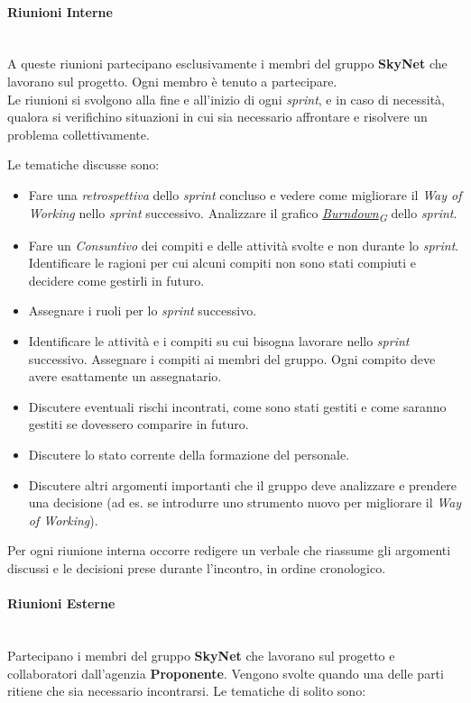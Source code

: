 \documentclass[12pt, a4paper]{article}
\newcommand{\urlglossario}{https://skynetunigroup.github.io/Code_Guardian/Documentazione/PB/glossario_v2.0.0.pdf} %
\newcommand{\glo}[2]{\href{\urlglossario\#nameddest=#2}{#1\textsubscript{G}}}
\begin{document}
\paragraph{Riunioni Interne}\mbox{}\\
A queste riunioni partecipano esclusivamente i membri del gruppo \textbf{SkyNet} che lavorano sul progetto. Ogni membro è tenuto a partecipare.\\
Le riunioni si svolgono alla fine e all'inizio di ogni \textit{sprint}, e in caso di necessità, qualora si verifichino situazioni in cui sia necessario affrontare e risolvere un problema collettivamente.

Le tematiche discusse sono:

\begin{itemize}
\item
  Fare una \textit{retrospettiva} dello \textit{sprint} concluso e vedere come migliorare il \textit{Way of Working} nello \textit{sprint} successivo. Analizzare il grafico \textit{\glo{Burndown}{burndown-chart}} dello \textit{sprint}.
\item
  Fare un \textit{Consuntivo} dei compiti e delle attività svolte e non durante lo \textit{sprint}. Identificare le ragioni per cui alcuni compiti non sono stati compiuti e decidere come gestirli in futuro.
 \item
  Assegnare i ruoli per lo \textit{sprint} successivo.
\item
  Identificare le attività e i compiti su cui bisogna lavorare nello \textit{sprint} successivo. Assegnare i compiti ai membri del gruppo. Ogni compito deve avere esattamente un assegnatario.
 \item
  Discutere eventuali rischi incontrati, come sono stati gestiti e come saranno gestiti se dovessero comparire in futuro.
 \item
  Discutere lo stato corrente della formazione del personale.
 \item
  Discutere altri argomenti importanti che il gruppo deve analizzare e prendere una decisione (ad es. se introdurre uno strumento nuovo per migliorare il \textit{Way of Working}).
 \end{itemize}

Per ogni riunione interna occorre redigere un verbale che riassume gli argomenti discussi e le decisioni prese durante l'incontro, in ordine cronologico.

\paragraph{Riunioni Esterne}\mbox{}\\
Partecipano i membri del gruppo \textbf{SkyNet} che lavorano sul progetto e collaboratori dall'agenzia \textbf{Proponente}. Vengono svolte quando una delle parti ritiene che sia necessario incontrarsi. Le tematiche di solito sono:
\end{document}

